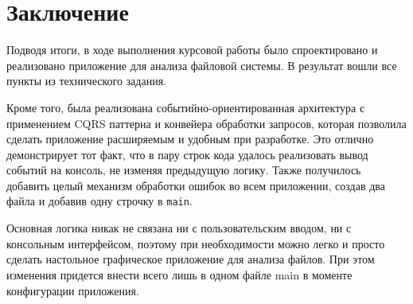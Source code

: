 \chapter*{Заключение} \label{ch-conclusion}

Подводя итоги, в ходе выполнения курсовой работы было спроектировано и реализовано приложение для анализа файловой системы. В результат вошли все пункты из технического задания.

Кроме того, была реализована событийно-ориентированная архитектура с применением CQRS паттерна и конвейера обработки запросов, которая позволила сделать приложение расширяемым и удобным при разработке. Это отлично демонстрирует тот факт, что в пару строк кода удалось реализовать вывод событий на консоль, не изменяя предыдущую логику. Также получилось добавить целый механизм обработки ошибок во всем приложении, создав два файла и добавив одну строчку в \verb|main|.

Основная логика никак не связана ни с пользовательским вводом, ни с консольным интерфейсом, поэтому при необходимости можно легко и просто сделать настольное графическое приложение для анализа файлов. При этом изменения придется внести всего лишь в одном файле main в моменте конфигурации приложения.